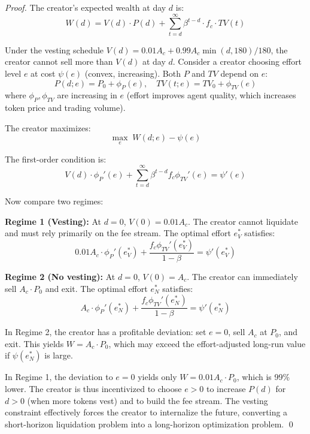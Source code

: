 \begin{proof}
The creator's expected wealth at day $d$ is:
\begin{equation}
  W(d) = V(d) \cdot P(d) + \sum_{t=d}^{\infty} \beta^{t-d} \cdot f_c \cdot TV(t)
\end{equation}

Under the vesting schedule $V(d) = 0.01 A_c + 0.99 A_c \min(d, 180)/180$,
the creator cannot sell more than $V(d)$ at day $d$. Consider a creator
choosing effort level $e$ at cost $\psi(e)$ (convex, increasing). Both $P$
and $TV$ depend on $e$:
\begin{equation}
  P(d; e) = P_0 + \phi_P(e), \quad TV(t; e) = TV_0 + \phi_{TV}(e)
\end{equation}
where $\phi_P, \phi_{TV}$ are increasing in $e$ (effort improves agent quality,
which increases token price and trading volume).

The creator maximizes:
\begin{equation}
  \max_e \; W(d; e) - \psi(e)
\end{equation}

The first-order condition is:
\begin{equation}
  V(d) \cdot \phi_P'(e) + \sum_{t=d}^{\infty} \beta^{t-d} f_c \phi_{TV}'(e) = \psi'(e)
\end{equation}

Now compare two regimes:

\textbf{Regime 1 (Vesting):} At $d = 0$, $V(0) = 0.01 A_c$. The creator
cannot liquidate and must rely primarily on the fee stream. The optimal effort
$e^*_V$ satisfies:
\begin{equation}
  0.01 A_c \cdot \phi_P'(e^*_V) + \frac{f_c \phi_{TV}'(e^*_V)}{1 - \beta} = \psi'(e^*_V)
\end{equation}

\textbf{Regime 2 (No vesting):} At $d = 0$, $V(0) = A_c$. The creator can
immediately sell $A_c \cdot P_0$ and exit. The optimal effort $e^*_N$ satisfies:
\begin{equation}
  A_c \cdot \phi_P'(e^*_N) + \frac{f_c \phi_{TV}'(e^*_N)}{1 - \beta} = \psi'(e^*_N)
\end{equation}

In Regime 2, the creator has a profitable deviation: set $e = 0$, sell $A_c$
at $P_0$, and exit. This yields $W = A_c \cdot P_0$, which may exceed the
effort-adjusted long-run value if $\psi(e^*_N)$ is large.

In Regime 1, the deviation to $e = 0$ yields only $W = 0.01 A_c \cdot P_0$,
which is 99\% lower. The creator is thus incentivized to choose $e > 0$ to
increase $P(d)$ for $d > 0$ (when more tokens vest) and to build the fee
stream. The vesting constraint effectively forces the creator to internalize
the future, converting a short-horizon liquidation problem into a long-horizon
optimization problem. \qed
\end{proof}

